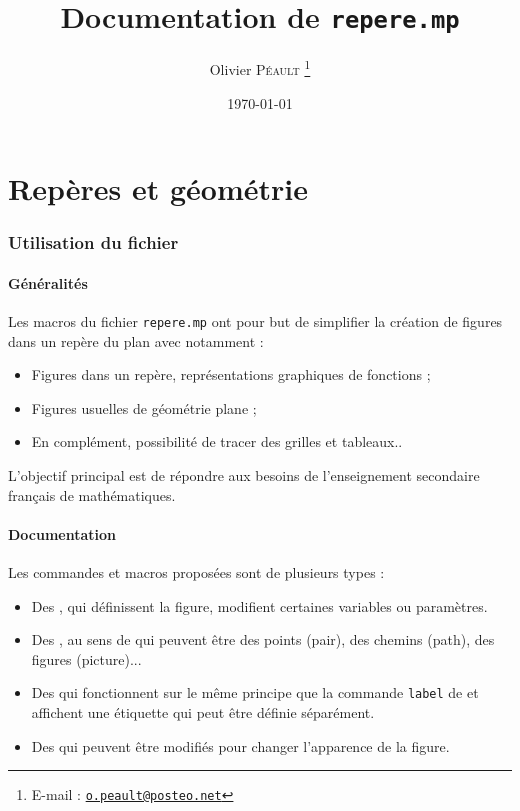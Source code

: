 \documentclass[11pt,a4paper,french]{article}
\begin{document}
\DecimalMathComma
\title{Documentation de \texttt{repere.mp}}
\date{\today}
\author{Olivier \textsc{Péault}%
\footnote{E-mail : \href{mailto:o.peault@posteo.net}{\texttt{o.peault@posteo.net}}}}
\maketitle

\setcounter{tocdepth}{2}

\setlength{\columnsep}{25pt}
{\small
\tableofcontents}
\setlength{\columnsep}{10pt}

\part{Repères et géométrie}
\section{Utilisation du fichier}

\subsection{Généralités}
Les macros du fichier \verb+repere.mp+ ont pour but de simplifier la création de figures dans un repère du plan avec \MP{} notamment :
\begin{itemize}
\item Figures dans un repère, représentations graphiques de fonctions ;
\item Figures usuelles de géométrie plane ;
\item En complément, possibilité de tracer des grilles et tableaux..
\end{itemize}

L'objectif principal est de répondre aux besoins de l'enseignement secondaire français de mathématiques.


\subsection{Documentation}

Les commandes et macros proposées sont de plusieurs types :
\begin{itemize}
\item Des , qui définissent la figure, modifient certaines variables ou paramètres.
\item Des , au sens de \MP{} qui peuvent être des points (pair), des chemins (path), des figures (picture)...
\item Des  qui fonctionnent sur le même principe que la commande \verb|label| de \MP{} et affichent une étiquette qui peut être définie séparément.
\item Des  qui peuvent être modifiés pour changer l'apparence de la figure.
\end{itemize}
\end{document}
